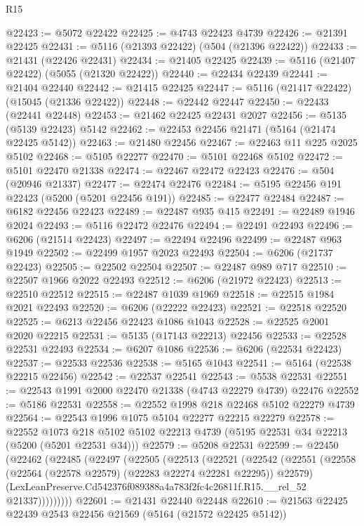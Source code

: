 \begin{lexlean}{R15}
\begin{coremodule}
{{{{{{{{{{{@22423 := @5072 @22422
@22425 := @4743 @22423 @4739
@22426 := @21391 @22425
@22431 := @5116 (@21393 @22422) (@504 (@21396 @22422))
@22433 := @21431 (@22426 @22431)
@22434 := @21405 @22425
@22439 := @5116 (@21407 @22422) (@5055 (@21320 @22422))
@22440 := @22434 @22439
@22441 := @21404 @22440
@22442 := @21415 @22425
@22447 := @5116 (@21417 @22422) (@15045 (@21336 @22422))
@22448 := @22442 @22447
@22450 := @22433 (@22441 @22448)
@22453 := @21462 @22425 @22431 @2027
@22456 := @5135 (@5139 @22423) @5142
@22462 := @22453 @22456 @21471 (@5164 (@21474 @22425 @5142))
@22463 := @21480 @22456
@22467 := @22463 @11 @225 @2025 @5102
@22468 := @5105 @22277
@22470 := @5101 @22468 @5102
@22472 := @5101 @22470 @21338
@22474 := @22467 @22472 @22423
@22476 := @504 (@20946 @21337)
@22477 := @22474 @22476
@22484 := @5195 @22456 @191 @22423 (@5200 (@5201 @22456 @191))
@22485 := @22477 @22484
@22487 := @6182 @22456 @22423
@22489 := @22487 @935 @415
@22491 := @22489 @1946 @2024
@22493 := @5116 @22472 @22476
@22494 := @22491 @22493
@22496 := @6206 (@21514 @22423)
@22497 := @22494 @22496
@22499 := @22487 @963 @1949
@22502 := @22499 @1957 @2023 @22493
@22504 := @6206 (@21737 @22423)
@22505 := @22502 @22504
@22507 := @22487 @989 @717
@22510 := @22507 @1966 @2022 @22493
@22512 := @6206 (@21972 @22423)
@22513 := @22510 @22512
@22515 := @22487 @1039 @1969
@22518 := @22515 @1984 @2021 @22493
@22520 := @6206 (@22222 @22423)
@22521 := @22518 @22520
@22525 := @6213 @22456 @22423 @1086 @1043
@22528 := @22525 @2001 @2020 @22215
@22531 := @5135 (@17143 @22213) @22456
@22533 := @22528 @22531 @22493
@22534 := @6207 @1086
@22536 := @6206 (@22534 @22423)
@22537 := @22533 @22536
@22538 := @5165 @1043
@22541 := @5164 (@22538 @22215 @22456)
@22542 := @22537 @22541
@22543 := @5538 @22531
@22551 := @22543 @1991 @2000 @22470 @21338 (@4743 @22279 @4739) @22476
@22552 := @5186 @22531
@22558 := @22552 @1998 @218 @22468 @5102 @22279 @4739
@22564 := @22543 @1996 @1075 @5104 @22277 @22215 @22279
@22578 := @22552
    @1073
    @218
    @5102
    @5102
    @22213
    @4739
    (@5195 @22531 @34 @22213 (@5200 (@5201 @22531 @34)))
@22579 := @5208 @22531
@22599 := @22450
    (@22462
      (@22485
        (@22497
          (@22505
            (@22513
              (@22521
                (@22542
                  (@22551
                    (@22558 (@22564 (@22578 @22579) (@22283 @22274 @22281 @22295)) @22579)
                    (LexLeanPreserve.Cd542376f089388a4a783f2fc4c26811f.R15.__rel_52 @21337)))))))))
@22601 := @21431 @22440 @22448
@22610 := @21563 @22425 @22439 @2543 @22456 @21569 (@5164 (@21572 @22425 @5142))
}}}}}}}}}}}
\end{coremodule}
\end{lexlean}
